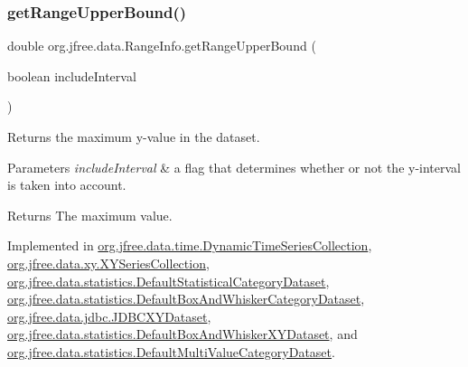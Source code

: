 \mbox{\label{interfaceorg_1_1jfree_1_1data_1_1_range_info_a85987bb398c50351d190b2b888ff3348}} 
\subsubsection{\texorpdfstring{get\+Range\+Upper\+Bound()}{getRangeUpperBound()}}
{\footnotesize\ttfamily double org.\+jfree.\+data.\+Range\+Info.\+get\+Range\+Upper\+Bound (\begin{DoxyParamCaption}\item[{boolean}]{include\+Interval }\end{DoxyParamCaption})}

Returns the maximum y-\/value in the dataset.


\begin{DoxyParams}{Parameters}
{\em include\+Interval} & a flag that determines whether or not the y-\/interval is taken into account.\\
\hline
\end{DoxyParams}
\begin{DoxyReturn}{Returns}
The maximum value. 
\end{DoxyReturn}


Implemented in \mbox{\hyperlink{classorg_1_1jfree_1_1data_1_1time_1_1_dynamic_time_series_collection_ad50df36bbe93b4ac342e1dffe79f7316}{org.\+jfree.\+data.\+time.\+Dynamic\+Time\+Series\+Collection}}, \mbox{\hyperlink{classorg_1_1jfree_1_1data_1_1xy_1_1_x_y_series_collection_a2d165d7e676b4d1350aeabb8b503270f}{org.\+jfree.\+data.\+xy.\+X\+Y\+Series\+Collection}}, \mbox{\hyperlink{classorg_1_1jfree_1_1data_1_1statistics_1_1_default_statistical_category_dataset_a11d0eee861d88a758d3a400d428aebc8}{org.\+jfree.\+data.\+statistics.\+Default\+Statistical\+Category\+Dataset}}, \mbox{\hyperlink{classorg_1_1jfree_1_1data_1_1statistics_1_1_default_box_and_whisker_category_dataset_a32f1be24a5e0f73dd538f73ee8c4bd40}{org.\+jfree.\+data.\+statistics.\+Default\+Box\+And\+Whisker\+Category\+Dataset}}, \mbox{\hyperlink{classorg_1_1jfree_1_1data_1_1jdbc_1_1_j_d_b_c_x_y_dataset_a65026164f00394b483b43d73c8313ade}{org.\+jfree.\+data.\+jdbc.\+J\+D\+B\+C\+X\+Y\+Dataset}}, \mbox{\hyperlink{classorg_1_1jfree_1_1data_1_1statistics_1_1_default_box_and_whisker_x_y_dataset_af4b8db18842a1e178cf7b11575cda566}{org.\+jfree.\+data.\+statistics.\+Default\+Box\+And\+Whisker\+X\+Y\+Dataset}}, and \mbox{\hyperlink{classorg_1_1jfree_1_1data_1_1statistics_1_1_default_multi_value_category_dataset_a508f2311f69392da32bad6065be873c4}{org.\+jfree.\+data.\+statistics.\+Default\+Multi\+Value\+Category\+Dataset}}.



